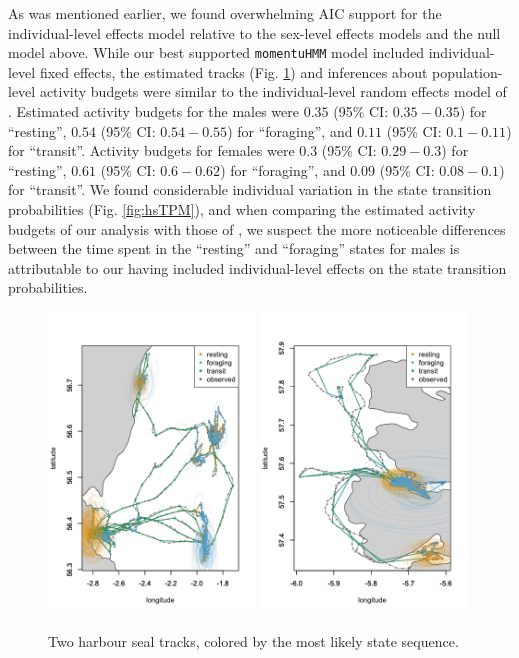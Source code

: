 \documentclass[12pt]{article}\usepackage[]{graphicx}\usepackage[]{color}
\begin{document}
As was mentioned earlier, we found overwhelming AIC support for the individual-level effects model relative to the sex-level effects models and the null model above. While our best supported \verb|momentuHMM| model included individual-level fixed effects, the estimated tracks (Fig. \ref{fig:hsTracks}) and inferences about population-level activity budgets were similar to the individual-level random effects model of \cite{McClintockEtAl2013c}. Estimated activity budgets for the males were $0.35$ (95\% CI: $0.35-0.35$) for ``resting'', $0.54$ (95\% CI: $0.54-0.55$) for ``foraging'', and $0.11$ (95\% CI: $0.1-0.11$) for ``transit''.  Activity budgets for females were $0.3$ (95\% CI: $0.29-0.3$) for ``resting'', $0.61$ (95\% CI: $0.6-0.62$) for ``foraging'', and $0.09$ (95\% CI: $0.08-0.1$) for ``transit''. We found considerable individual variation in the state transition probabilities (Fig. \ref{fig:hsTPM}), and when comparing the estimated activity budgets of our analysis with those of \cite{McClintockEtAl2013c}, we suspect the more noticeable differences between the time spent in the ``resting'' and ``foraging'' states for males is attributable to our having included individual-level effects on the state transition probabilities.  
\begin{figure}[htbp]
  \centering
  \includegraphics[width=0.49\textwidth]{plot_harbourSeal8.png}
    \includegraphics[width=0.49\textwidth]{plot_harbourSeal1.png}
  \caption{Two harbour seal tracks, colored by the most likely state sequence.}
  \label{fig:hsTracks}
\end{figure}
\end{document}
